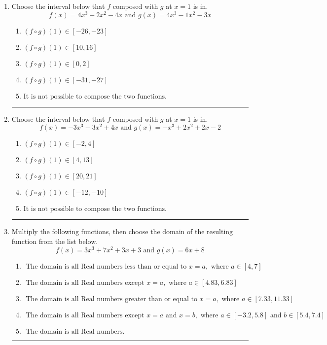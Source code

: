 \documentclass[14pt]{extbook}
\newcommand{\litem}[1]{\item#1\hspace*{-1cm}\rule{\textwidth}{0.4pt}}
\begin{document}
\begin{enumerate}
\litem{
Choose the interval below that $f$ composed with $g$ at $x=1$ is in.\[ f(x) = 4x^{3} -2 x^{2} -4 x \text{ and } g(x) = 4x^{3} -1 x^{2} -3 x \]\begin{enumerate}[label=\Alph*.]
\item \( (f \circ g)(1) \in [-26, -23] \)
\item \( (f \circ g)(1) \in [10, 16] \)
\item \( (f \circ g)(1) \in [0, 2] \)
\item \( (f \circ g)(1) \in [-31, -27] \)
\item \( \text{It is not possible to compose the two functions.} \)

\end{enumerate} }
\litem{
Choose the interval below that $f$ composed with $g$ at $x=1$ is in.\[ f(x) = -3x^{3} -3 x^{2} +4 x \text{ and } g(x) = -x^{3} +2 x^{2} +2 x -2 \]\begin{enumerate}[label=\Alph*.]
\item \( (f \circ g)(1) \in [-2, 4] \)
\item \( (f \circ g)(1) \in [4, 13] \)
\item \( (f \circ g)(1) \in [20, 21] \)
\item \( (f \circ g)(1) \in [-12, -10] \)
\item \( \text{It is not possible to compose the two functions.} \)

\end{enumerate} }
\litem{
Multiply the following functions, then choose the domain of the resulting function from the list below.\[ f(x) = 3x^{3} +7 x^{2} +3 x + 3 \text{ and } g(x) = 6x + 8 \]\begin{enumerate}[label=\Alph*.]
\item \( \text{ The domain is all Real numbers less than or equal to } x = a, \text{ where } a \in [4, 7] \)
\item \( \text{ The domain is all Real numbers except } x = a, \text{ where } a \in [4.83, 6.83] \)
\item \( \text{ The domain is all Real numbers greater than or equal to } x = a, \text{ where } a \in [7.33, 11.33] \)
\item \( \text{ The domain is all Real numbers except } x = a \text{ and } x = b, \text{ where } a \in [-3.2, 5.8] \text{ and } b \in [5.4, 7.4] \)
\item \( \text{ The domain is all Real numbers. } \)


\end{enumerate}}
\end{enumerate}
\end{document}
